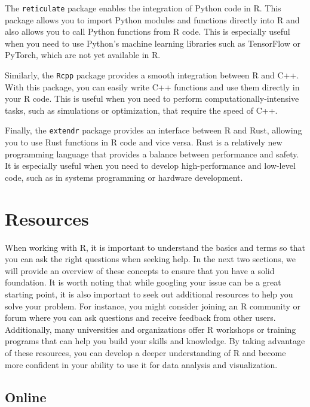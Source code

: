 \documentclass[
]{book}
\begin{document}
The \texttt{reticulate} package enables the integration of Python code in R. This package allows you to import Python modules and functions directly into R and also allows you to call Python functions from R code. This is especially useful when you need to use Python's machine learning libraries such as TensorFlow or PyTorch, which are not yet available in R.

Similarly, the \texttt{Rcpp} package provides a smooth integration between R and C++. With this package, you can easily write C++ functions and use them directly in your R code. This is useful when you need to perform computationally-intensive tasks, such as simulations or optimization, that require the speed of C++.

Finally, the \texttt{extendr} package provides an interface between R and Rust, allowing you to use Rust functions in R code and vice versa. Rust is a relatively new programming language that provides a balance between performance and safety. It is especially useful when you need to develop high-performance and low-level code, such as in systems programming or hardware development.

\hypertarget{resources}{%
\section*{Resources}\label{resources}}

When working with R, it is important to understand the basics and terms so that you can ask the right questions when seeking help. In the next two sections, we will provide an overview of these concepts to ensure that you have a solid foundation. It is worth noting that while googling your issue can be a great starting point, it is also important to seek out additional resources to help you solve your problem. For instance, you might consider joining an R community or forum where you can ask questions and receive feedback from other users. Additionally, many universities and organizations offer R workshops or training programs that can help you build your skills and knowledge. By taking advantage of these resources, you can develop a deeper understanding of R and become more confident in your ability to use it for data analysis and visualization.

\hypertarget{online}{%
\subsection*{Online}\label{online}}
\end{document}
